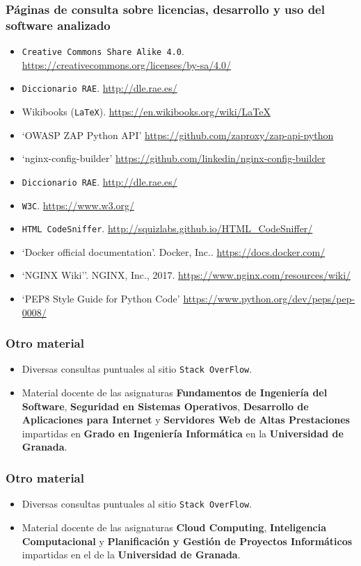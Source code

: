 
\printbibliography[heading=bibempty]

\bigskip
\subsubsection*{Páginas de consulta sobre licencias, desarrollo y uso del software analizado}
\begin{itemize}
	\item {\tt Creative Commons Share Alike 4.0}. \url{https://creativecommons.org/licenses/by-sa/4.0/}
	\item {\tt Diccionario RAE}. \url{http://dle.rae.es/}
	\item Wikibooks ({\tt LaTeX}). \url{https://en.wikibooks.org/wiki/LaTeX}
	\item `OWASP ZAP Python API' \url{https://github.com/zaproxy/zap-api-python}
	\item `nginx-config-builder' \url{https://github.com/linkedin/nginx-config-builder}
	\item {\tt Diccionario RAE}. \url{http://dle.rae.es/}
	\item {\tt W3C}. \url{https://www.w3.org/}
	\item {\tt HTML CodeSniffer}. \url{http://squizlabs.github.io/HTML_CodeSniffer/}
	\item `Docker official documentation'. Docker, Inc.. \url{https://docs.docker.com/}
	\item `NGINX Wiki''. NGINX, Inc., 2017. \url{https://www.nginx.com/resources/wiki/}
	\item `PEP8 Style Guide for Python Code' \url{https://www.python.org/dev/peps/pep-0008/}
\end{itemize}
\bigskip
\subsubsection*{Otro material}
\begin{itemize}
	\item Diversas consultas puntuales al sitio {\tt Stack OverFlow}.
	\item Material docente de las asignaturas \textbf{Fundamentos de Ingeniería del Software}, \textbf{Seguridad en Sistemas Operativos}, \textbf{Desarrollo de Aplicaciones para Internet} y \textbf{Servidores Web de Altas Prestaciones} impartidas en \textbf{Grado en Ingeniería Informática} en la \textbf{Universidad de Granada}.
\end{itemize}

\subsubsection*{Otro material}
\begin{itemize}
	\item Diversas consultas puntuales al sitio {\tt Stack OverFlow}.
	\item Material docente de las asignaturas \textbf{Cloud Computing}, \textbf{Inteligencia Computacional} y \textbf{Planificación y Gestión de Proyectos Informáticos} impartidas en el \master de la \textbf{Universidad de Granada}.
\end{itemize}